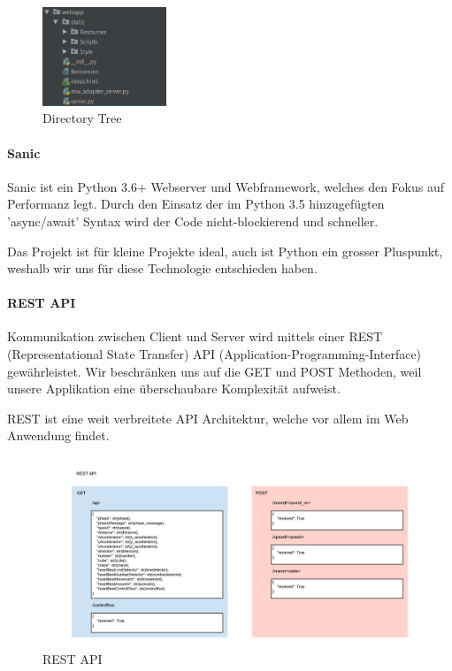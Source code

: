 \documentclass[../../main.tex]{subfiles}
\begin{document}
\begin{figure}[H] \centering
  \includegraphics[width=0.33\textwidth]{Dirtree}
  \caption{Directory Tree}
  \label{fig:Dateibaum}
\end{figure}

\paragraph{Sanic}
Sanic ist ein Python 3.6+ Webserver und Webframework, welches den Fokus auf Performanz legt. Durch den Einsatz der im Python 3.5 hinzugefügten 'async/await' Syntax wird der Code nicht-blockierend und schneller.

Das Projekt ist für kleine Projekte ideal, auch ist Python ein grosser Pluspunkt, weshalb wir uns für diese Technologie entschieden haben.

\paragraph{REST API} 
Kommunikation zwischen Client und Server wird mittels einer REST (Representational State Transfer) API (Application-Programming-Interface) gewährleistet. Wir beschränken uns auf die GET und POST Methoden, weil unsere Applikation eine überschaubare Komplexität aufweist.

REST ist eine weit verbreitete API Architektur, welche vor allem im Web Anwendung findet.

\begin{figure}[H] \centering
  \includegraphics[width=1\textwidth]{RESTAPI}
  \caption{REST API}
  \label{fig:REST API Web}
\end{figure}
\end{document}
